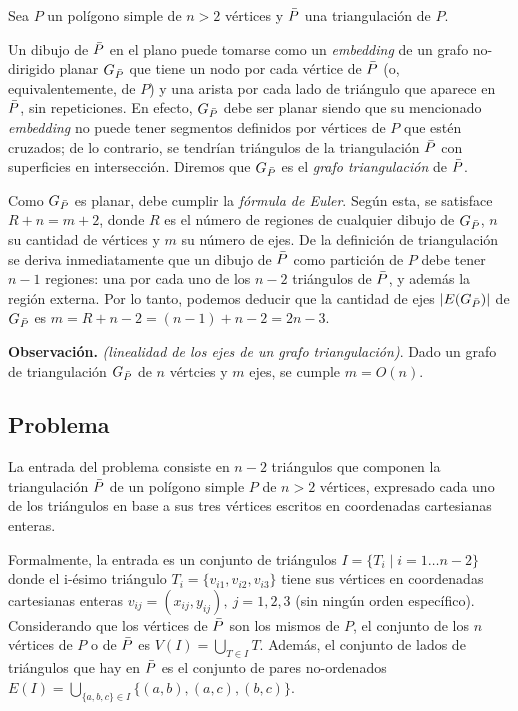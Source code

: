 Sea $P$ un polígono simple de $n > 2$ vértices y $\bar{P}$ una triangulación de $P$.

\medskip

Un dibujo de $\bar{P}$ en el plano puede tomarse como un \textit{embedding} de un grafo no-dirigido planar $G_{\bar{P}}$ que tiene un nodo por cada vértice de $\bar{P}$ (o, equivalentemente, de $P$) y una arista por cada lado de triángulo que aparece en $\bar{P}$, sin repeticiones. En efecto, $G_{\bar{P}}$ debe ser planar siendo que su mencionado \textit{embedding} no puede tener segmentos definidos por vértices de $P$ que estén cruzados; de lo contrario, se tendrían triángulos de la triangulación $\bar{P}$ con superficies en intersección. Diremos que $G_{\bar{P}}$ es el \textit{grafo triangulación} de $\bar{P}$.

\medskip

Como $G_{\bar{P}}$ es planar, debe cumplir la \textit{fórmula de Euler}. Según esta, se satisface $R + n = m + 2$, donde $R$ es el número de regiones de cualquier dibujo de $G_{\bar{P}}$, $n$ su cantidad de vértices y $m$ su número de ejes. De la definición de triangulación se deriva inmediatamente que un dibujo de $\bar{P}$ como partición de $P$ debe tener $n-1$ regiones: una por cada uno de los $n-2$ triángulos de $\bar{P}$, y además la región externa. Por lo tanto, podemos deducir que la cantidad de ejes $|E(G_{\bar{P}})|$ de $G_{\bar{P}}$ es $m = R + n - 2 = (n-1) + n - 2 = 2n-3$.

\medskip

\textbf{Observación.} \textit{(linealidad de los ejes de un grafo triangulación)}. Dado un grafo de triangulación $G_{\bar{P}}$ de $n$ vértcies y $m$ ejes, se cumple $m = O(n)$.

\subsection{Problema}

La entrada del problema consiste en $n-2$ triángulos que componen la triangulación $\bar{P}$ de un polígono simple $P$ de $n > 2$ vértices, expresado cada uno de los triángulos en base a sus tres vértices escritos en coordenadas cartesianas enteras. 

Formalmente, la entrada es un conjunto de triángulos $I = \{ T_i \mid i = 1 \dots n-2 \}$ donde el i-ésimo triángulo $T_i = \{ v_{i1}, v_{i2}, v_{i3} \}$ tiene sus vértices en coordenadas cartesianas enteras $v_{ij} = (x_{ij}, y_{ij}), \ j = 1,2,3$ (sin ningún orden específico). Considerando que los vértices de $\bar{P}$ son los mismos de $P$, el conjunto de los $n$ vértices de $P$ o de $\bar{P}$ es $V(I) = \bigcup_{T \in I} T$. Además, el conjunto de lados de triángulos que hay en $\bar{P}$ es el conjunto de pares no-ordenados $E(I) = \bigcup_{\{ a,b,c \} \in I} \{ (a,b), (a,c), (b,c) \}$.

